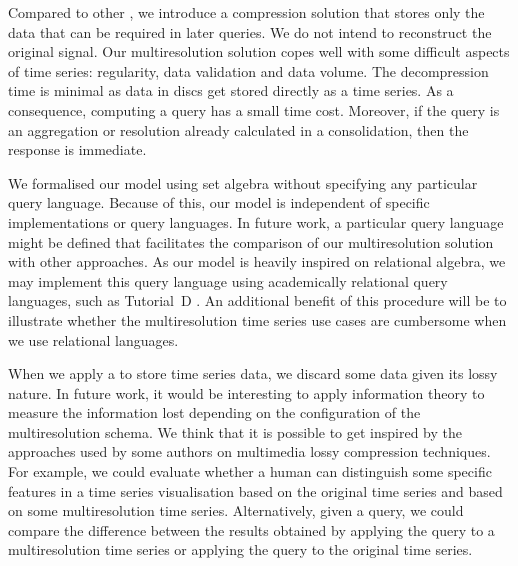 Compared to other , we introduce a compression solution
that stores only the data that can be required in later queries. We do
not intend to reconstruct the original signal. Our multiresolution
solution copes well with some difficult aspects of time series:
regularity, data validation and data volume.  The decompression time
is minimal as data in discs get stored directly as a time series. As a
consequence, computing a query has a small time cost. Moreover, if the
query is an aggregation or resolution already calculated in a
 consolidation, then the response is immediate.


We formalised our model using set algebra without specifying any
particular query language. Because of this, our model is independent
of specific implementations or query languages.  In future work, a
particular query language might be defined that facilitates the
comparison of our multiresolution solution with other approaches. As
our model is heavily inspired on relational algebra, we may implement
this query language using academically relational query languages,
such as Tutorial~D \cite{date:introduction}.  An additional benefit of
this procedure will be to illustrate whether the multiresolution time
series use cases are cumbersome when we use relational languages.


When we apply a  to store time series data, we discard
some data given its lossy nature.  In future work, it would be
interesting to apply information theory to measure the information
lost depending on the configuration of the multiresolution schema. We
think that it is possible to get inspired by the approaches used by
some authors on multimedia lossy compression techniques. For example,
we could evaluate whether a human can distinguish some specific
features in a time series visualisation based on the original time
series and based on some multiresolution time series. Alternatively,
given a query, we could compare the difference between the results
obtained by applying the query to a multiresolution time series or
applying the query to the original time series.




